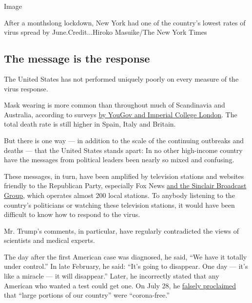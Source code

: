 Image

After a monthslong lockdown, New York had one of the country's lowest
rates of virus spread by June.Credit...Hiroko Masuike/The New York Times

\hypertarget{the-message-is-the-response}{%
\subsection{The message is the
response}\label{the-message-is-the-response}}

The United States has not performed uniquely poorly on every measure of
the virus response.

Mask wearing is more common than throughout much of Scandinavia and
Australia, according to surveys
\href{https://www.imperial.ac.uk/media/imperial-college/institute-of-global-health-innovation/ICL-YouGov-Covid-19-Behavour-Tracker_Global_FaceMask_20200609_VF.pdf}{by
YouGov and Imperial College London}. The total death rate is still
higher in Spain, Italy and Britain.

But there is one way --- in addition to the scale of the continuing
outbreaks and deaths --- that the United States stands apart: In no
other high-income country have the messages from political leaders been
nearly so mixed and confusing.

These messages, in turn, have been amplified by television stations and
websites friendly to the Republican Party, especially Fox News
\href{https://www.washingtonpost.com/lifestyle/media/sinclair-yanked-a-pandemic-conspiracy-theory-program-but-it-has-stayed-in-line-with-trump-on-coronavirus/2020/07/31/5d90a296-d021-11ea-8c55-61e7fa5e82ab_story.html}{and
the Sinclair Broadcast Group}, which operates almost 200 local stations.
To anybody listening to the country's politicians or watching these
television stations, it would have been difficult to know how to respond
to the virus.

Mr. Trump's comments, in particular, have regularly contradicted the
views of scientists and medical experts.

The day after the first American case was diagnosed, he said, ``We have
it totally under control.'' In late February, he said: ``It's going to
disappear. One day --- it's like a miracle --- it will disappear.''
Later, he incorrectly stated that any American who wanted a test could
get one. On July 28, he
\href{https://www.nytimes.com/2020/07/28/us/politics/trump-nobody-likes-me-walks-out-briefing.html}{falsely
proclaimed} that ``large portions of our country'' were ``corona-free.''

